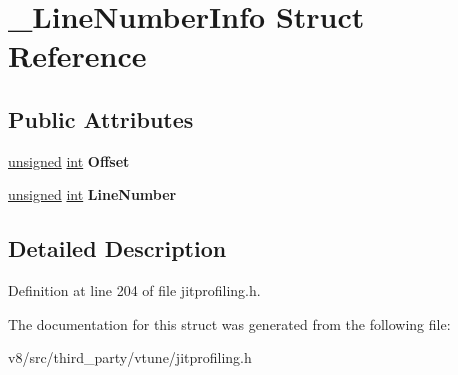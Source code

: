 \hypertarget{struct__LineNumberInfo}{}\section{\+\_\+\+Line\+Number\+Info Struct Reference}
\label{struct__LineNumberInfo}
\subsection*{Public Attributes}
\begin{DoxyCompactItemize}
\item 
\mbox{\label{struct__LineNumberInfo_a05e4308f18790d0556bc28f3f916335e}} 
\mbox{\hyperlink{classunsigned}{unsigned}} \mbox{\hyperlink{classint}{int}} {\bfseries Offset}
\item 
\mbox{\label{struct__LineNumberInfo_a7bc3b6e7a1f4b21576a71525ab9f4d86}} 
\mbox{\hyperlink{classunsigned}{unsigned}} \mbox{\hyperlink{classint}{int}} {\bfseries Line\+Number}
\end{DoxyCompactItemize}


\subsection{Detailed Description}


Definition at line 204 of file jitprofiling.\+h.



The documentation for this struct was generated from the following file\+:\begin{DoxyCompactItemize}
\item 
v8/src/third\+\_\+party/vtune/jitprofiling.\+h\end{DoxyCompactItemize}
